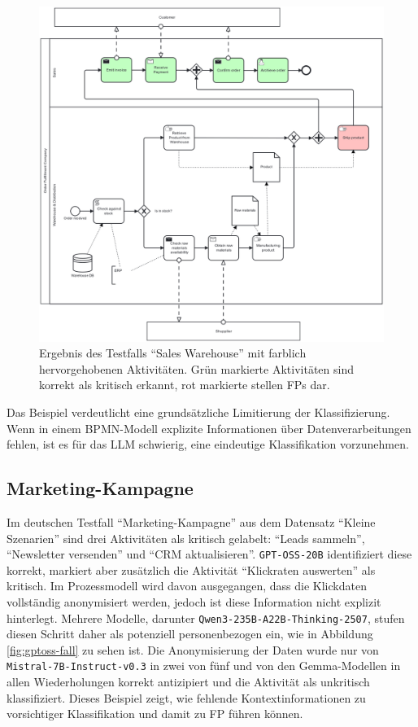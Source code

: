 \begin{figure}
    \centering
    \includegraphics[height=.41\textheight]{images/results/examples/qwen3-235B-run-3-uni-sales-warehouse}
    \caption{Ergebnis des Testfalls \enquote{Sales Warehouse} mit farblich hervorgehobenen Aktivitäten. Grün markierte Aktivitäten sind korrekt als kritisch erkannt, rot markierte stellen \acp{FP} dar.}
    \label{fig:qwen3-fall}
\end{figure}

Das Beispiel verdeutlicht eine grundsätzliche Limitierung der Klassifizierung. Wenn in einem \ac{BPMN}-Modell explizite Informationen über Datenverarbeitungen fehlen, ist es für das \ac{LLM} schwierig, eine eindeutige Klassifikation vorzunehmen.

\subsection*{Marketing-Kampagne}

Im deutschen Testfall \enquote{Marketing-Kampagne} aus dem Datensatz \enquote{Kleine Szenarien} sind drei Aktivitäten als kritisch gelabelt: \enquote{Leads sammeln}, \enquote{Newsletter versenden} und \enquote{CRM aktualisieren}. \texttt{GPT-OSS-20B} identifiziert diese korrekt, markiert aber zusätzlich die Aktivität \enquote{Klickraten auswerten} als kritisch. Im Prozessmodell wird davon ausgegangen, dass die Klickdaten vollständig anonymisiert werden, jedoch ist diese Information nicht explizit hinterlegt. Mehrere Modelle, darunter \texttt{Qwen3-235B-A22B-Thinking-2507}, stufen diesen Schritt daher als potenziell personenbezogen ein, wie in Abbildung \ref{fig:gptoss-fall} zu sehen ist. Die Anonymisierung der Daten wurde nur von \texttt{Mistral-7B-Instruct-v0.3} in zwei von fünf und von den Gemma-Modellen in allen Wiederholungen korrekt antizipiert und die Aktivität als unkritisch klassifiziert. Dieses Beispiel zeigt, wie fehlende Kontextinformationen zu vorsichtiger Klassifikation und damit zu \ac{FP} führen können.

